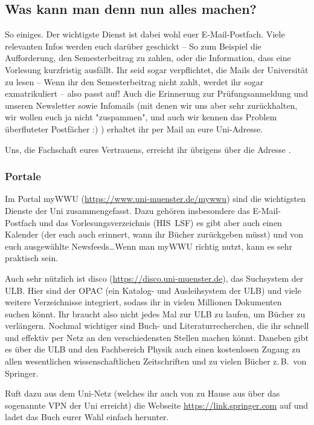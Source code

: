 \begin{multicols}{2}
\subsection{Was kann man denn nun alles machen?}
So einiges. Der wichtigste Dienst ist dabei wohl euer E-Mail-Postfach.
Viele relevanten Infos werden euch darüber geschickt -- So zum Beispiel die Aufforderung, den Semesterbeitrag zu zahlen, oder die Information, dass eine Vorlesung kurzfristig ausfällt.
Ihr seid sogar verpflichtet, die Mails der Universität zu lesen -- Wenn ihr den Semesterbeitrag nicht zahlt, werdet ihr sogar exmatrikuliert -- also passt auf! 
Auch die Erinnerung zur Prüfungsanmeldung und unseren Newsletter sowie Infomails (mit denen wir uns aber sehr zurückhalten, wir wollen euch ja nicht "zuspammen", und auch wir kennen das Problem überfluteter Postfächer :) ) erhaltet ihr per Mail an eure Uni-Adresse.

Uns, die Fachschaft eures Vertrauens, erreicht ihr übrigens über die Adresse .

\subsubsection{Portale}
Im Portal myWWU (\url{https://www.uni-muenster.de/mywwu}) sind die wichtigsten Dienste der Uni zusammengefasst.
Dazu gehören insbesondere das E-Mail-Postfach und das Vorlesungsverzeichnis (HIS~LSF) es gibt aber auch einen Kalender (der euch auch erinnert, wann ihr Bücher zurückgeben müsst) und von euch ausgewählte Newsfeeds\dots Wenn man myWWU richtig nutzt, kann es sehr praktisch sein.

Auch sehr nützlich ist disco (\url{https://disco.uni-muenster.de}), das Suchsystem der ULB.
Hier sind der OPAC (ein Katalog- und Ausleihsystem der ULB) und viele weitere Verzeichnisse integriert, sodass ihr in vielen Millionen Dokumenten suchen könnt.
Ihr braucht also nicht jedes Mal zur ULB zu laufen, um Bücher zu verlängern.
Nochmal wichtiger sind Buch- und Literaturrecherchen, die ihr schnell und effektiv per Netz an den verschiedensten Stellen machen könnt.
Daneben gibt es über die ULB und den Fachbereich Physik auch einen kostenlosen Zugang zu allen wesentlichen wissenschaftlichen Zeitschriften und zu vielen Bücher z.\,B.\ von Springer.

Ruft dazu aus dem Uni-Netz (welches ihr auch von zu Hause aus über das sogenannte VPN der Uni erreicht) die Webseite \url{https://link.springer.com} auf und ladet das Buch eurer Wahl einfach herunter.


\end{multicols}
